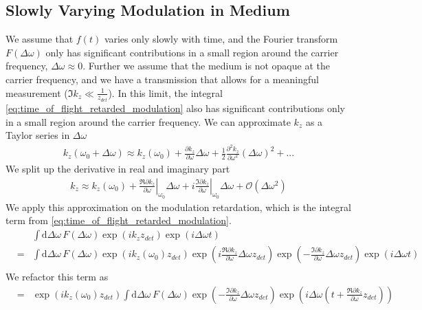 \documentclass[12pt,a4paper,twoside,openright,BCOR10mm,headsepline,titlepage,abstracton,chapterprefix,final]{scrreprt}
\newcommand\wavenumber{k}
\newcommand{\orderof}[1]{\mathcal{O}(#1)}
\newcommand\totald{\textrm{d}}
\begin{document}
\subsection{Slowly Varying Modulation in Medium}
We assume that $f(t)$ varies only slowly with time, 
and the Fourier transform $F(\Delta \omega)$ only has significant contributions 
in a small region around the carrier frequency, $\Delta \omega \approx 0$.
Further we assume that the medium is not opaque at the carrier frequency, 
and we have a transmission that allows for a meaningful measurement ($\Im \wavenumber_z \ll \frac{1}{z_{det}}$).
In this limit, the integral \eqref{eq:time_of_flight_retarded_modulation} also has significant contributions 
only in a small region around the carrier frequency.
We can approximate $\wavenumber_z$ as a Taylor series in $\Delta \omega$
\begin{eqnarray}
 \wavenumber_z(\omega_0+\Delta\omega) 
 \approx \wavenumber_z(\omega_0) 
 + \frac{\partial \wavenumber_z}{\partial \omega} \Delta \omega 
 + \frac{1}{2} \frac{\partial^2 \wavenumber_z}{\partial \omega^2} (\Delta \omega)^2
 + ...
\end{eqnarray}
We split up the derivative in real and imaginary part
\begin{eqnarray}
 \wavenumber_z 
 \approx \wavenumber_z(\omega_0) 
 +   \left. \frac{\Re \partial \wavenumber_z}{\partial \omega}\right|_{\omega_0} \Delta \omega 
 + i \left. \frac{\Im \partial \wavenumber_z}{\partial \omega}\right|_{\omega_0} \Delta \omega 
 + \orderof{\Delta\omega^2}
\end{eqnarray}
We apply this approximation on the modulation retardation, which is the integral term from \eqref{eq:time_of_flight_retarded_modulation}.
\begin{eqnarray}
 &&\int \totald\Delta\omega\, 
      F(\Delta \omega)
      \exp (i \wavenumber_z z_{det})
      \exp ( i \Delta \omega t)
 \\&=&
 \int \totald\Delta\omega\, 
      F(\Delta \omega)
      \exp (i \wavenumber_z(\omega_0) z_{det})
      \exp (i \frac{\Re \partial \wavenumber_z}{\partial \omega} \Delta \omega z_{det})
      \exp (- \frac{\Im \partial \wavenumber_z}{\partial \omega} \Delta \omega z_{det})
      \exp ( i \Delta \omega t)
 \nonumber\\
\end{eqnarray}
We refactor this term as
\begin{eqnarray}
 &=&
 \exp (i \wavenumber_z(\omega_0) z_{det})
 \int \totald\Delta\omega\, 
      F(\Delta \omega)
      \exp \left(- \frac{\Im \partial \wavenumber_z}{\partial \omega} \Delta \omega z_{det}\right)
      \exp \left( i \Delta \omega \left(t + \frac{\Re \partial \wavenumber_z}{\partial \omega} z_{det}\right)\right)
 \nonumber\\
\end{eqnarray}
\end{document}
